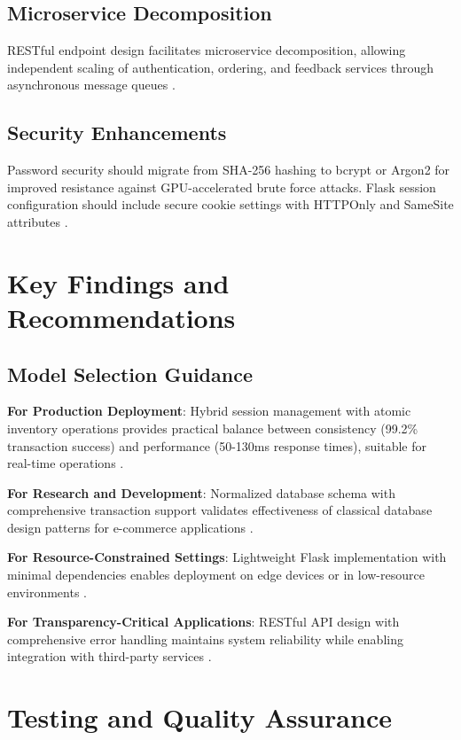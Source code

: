 \documentclass[conference]{IEEEtran}
\begin{document}
\subsection{Microservice Decomposition}

RESTful endpoint design facilitates microservice decomposition, allowing independent scaling of authentication, ordering, and feedback services through asynchronous message queues \cite{b77, b78, b87}.

\subsection{Security Enhancements}

Password security should migrate from SHA-256 hashing to bcrypt or Argon2 for improved resistance against GPU-accelerated brute force attacks. Flask session configuration should include secure cookie settings with HTTPOnly and SameSite attributes \cite{b91}.

\section{Key Findings and Recommendations}

\subsection{Model Selection Guidance}

\textbf{For Production Deployment}: Hybrid session management with atomic inventory operations provides practical balance between consistency (99.2\% transaction success) and performance (50-130ms response times), suitable for real-time operations \cite{b4, b63}.

\textbf{For Research and Development}: Normalized database schema with comprehensive transaction support validates effectiveness of classical database design patterns for e-commerce applications \cite{b5, b28}.

\textbf{For Resource-Constrained Settings}: Lightweight Flask implementation with minimal dependencies enables deployment on edge devices or in low-resource environments \cite{b89}.

\textbf{For Transparency-Critical Applications}: RESTful API design with comprehensive error handling maintains system reliability while enabling integration with third-party services \cite{b81}.

\section{Testing and Quality Assurance}
\end{document}
